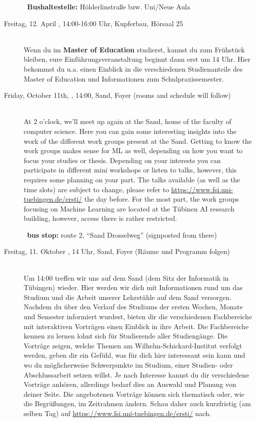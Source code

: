 \begin{description}
    ~\textbf{Bushaltestelle:} Hölderlinstraße bzw. Uni/Neue Aula

    \item[Freitag, 12. April \YEAR, 14:00-16:00 Uhr, Kupferbau, Hörsaal 25]\ \\
        Wenn du im \textbf{Master of Education} studierst, kannst du zum Frühstück bleiben, eure Einführungsveranstaltung beginnt dann erst um 14 Uhr. Hier bekommst du u.a. einen Einblick in die verschiedenen Studienanteile des Master of Education und Informationen zum Schulpraxissemester.
\fi

\ifml
	\item[Friday, October 11th, \YEAR, 14:00, Sand, Foyer (rooms and schedule will follow)]\ \\
	At 2 o'clock, we'll meet up again at the Sand, home of the faculty of computer science. %
	Here you can gain some interesting insights into the work of the different work groups present at the Sand.
	Getting to know the work groups makes sense for ML as well, depending on how you want to focus your studies or thesis. Depending on your interests you can participate in different mini workshops or listen to talks, however, this requires some planning on your part. The talks available (as well as the time slots) are subject to change, please refer to \url{https://www.fsi.uni-tuebingen.de/ersti/} the day before.
	For the most part, the work groups focusing on Machine Learning are located at the Tübinen AI research building, however, access there is rather restricted.

	~\textbf{bus stop:} route 2, "`Sand Drosselweg"' (signposted from there)
\else
	\item[Freitag, 11. Oktober \YEAR, 14 Uhr, Sand, Foyer (Räume und Programm folgen)]\ \\
	Um 14:00 treffen wir uns auf dem Sand (dem Sitz der Informatik in Tübingen) wieder. Hier werden wir dich mit Informationen rund um das Studium und die Arbeit unserer Lehrstühle auf dem Sand versorgen.
	Nachdem du über den Verlauf des Studiums der ersten Wochen, Monate und Semester informiert wurdest, bieten dir die verschiedenen Fachbereiche mit interaktiven Vorträgen einen Einblick in ihre Arbeit. Die Fachbereiche kennen zu lernen lohnt sich für Studierende aller Studiengänge. Die Vorträge zeigen, welche Themen am Wilhelm-Schickard-Institut verfolgt werden, geben dir ein Gefühl, was für dich hier interessant sein kann und wo du möglicherweise Schwerpunkte im Studium, einer Studien- oder Abschlussarbeit setzen willst. Je nach Interesse kannst du dir verschiedene Vorträge anhören, allerdings bedarf dies an Auswahl und Planung von deiner Seite. Die angebotenen Vorträge können sich thematisch oder, wie die Begrüßungen, im Zeitrahmen ändern. Schau daher auch kurzfristig (am selben Tag) auf \url{https://www.fsi.uni-tuebingen.de/ersti/} nach.


\end{description}
